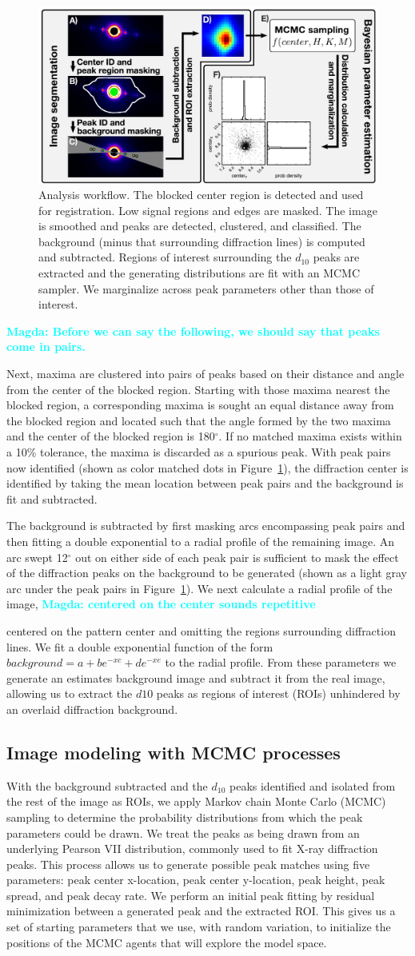 \documentclass{sig-alternate}
\newcommand{\note}[2]{
    \textbf{\textcolor{#1}{#2}}
}
\newcommand{\magda}[1]{\note{Cyan}{Magda: #1}}
\newcommand{\figureworkflow}{
\begin{figure}[tbp]
  \centering
  \includegraphics[width=\linewidth]{figures/img_analysis}
  \vspace{-8pt}
  \caption{\label{fig:workflow}
  	Analysis workflow.
    The blocked center region is detected and used for registration.
    Low signal regions and edges are masked. The image is smoothed and
    peaks are detected, clustered, and classified. The background
    (minus that surrounding diffraction lines) is computed and
    subtracted. Regions of interest surrounding the $d_{10}$ peaks are
    extracted and the generating distributions are fit with an MCMC
    sampler. We marginalize across peak parameters other than those of
    interest.  
	}
	\vspace{-2pt}
\end{figure}
}
\begin{document}
\figureworkflow

\magda{Before we can say the following, we should say that peaks
come in pairs.}
Next, maxima are clustered into pairs of peaks based on their distance
and angle from the center of the blocked region. Starting with those
maxima nearest the blocked region, a corresponding maxima is sought an
equal distance away from the blocked region and located such that the
angle formed by the two maxima and the center of the blocked region is
180$^\circ$. If no matched maxima exists within a 10\% tolerance, the
maxima is discarded as a spurious peak. With peak pairs now identified
(shown as color matched dots in Figure~\ref{fig:workflow}), the
diffraction center is identified by taking the mean location between
peak pairs and the background is fit and subtracted. 

The background is subtracted by first masking arcs encompassing peak
pairs and then fitting a double exponential to a radial profile of the
remaining image. An arc swept 12$^\circ$ out on either side of each
peak pair is sufficient to mask the effect of the diffraction peaks on
the background to be generated (shown as a light gray arc under the
peak pairs in Figure~\ref{fig:workflow}). We next calculate a radial
profile of the image, \magda{centered on the center sounds repetitive}
centered on the pattern center and omitting the regions surrounding
diffraction lines. We fit a double exponential function of the form
$background = a+ b e^{-x c} + d e^{-x e}$ to the radial profile. From
these parameters we generate an estimates background image and
subtract it from the real image, allowing us to extract the $d{10}$
peaks as regions of interest (ROIs) unhindered by an overlaid
diffraction background.

\subsection{Image modeling with MCMC processes}

With the background subtracted and the $d_{10}$ peaks identified and
isolated from the rest of the image as ROIs, we apply Markov chain
Monte Carlo (MCMC) sampling to determine the probability distributions
from which the peak parameters could be drawn. We treat the peaks as
being drawn from an underlying Pearson VII distribution, commonly used
to fit X-ray diffraction peaks. This process allows us to generate
possible peak matches using five parameters: peak center x-location,
peak center y-location, peak height, peak spread, and peak decay rate.
We perform an initial peak fitting by residual minimization between a
generated peak and the extracted ROI. This gives us a set of starting
parameters that we use, with random variation, to initialize the
positions of the MCMC agents that will explore the model space. 
\end{document}

